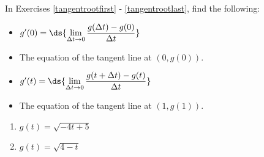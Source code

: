 \documentclass{ximera}
\begin{document}
In Exercises \ref{tangentrootfirst} - \ref{tangentrootlast},  find the following:



\begin{itemize}

\item  $g'(0) = \ds{\lim_{\Delta t \rightarrow 0} \dfrac{g(\Delta t) - g(0)}{\Delta t}}$

\item  The equation of the tangent line at $(0, g(0))$.

\item  $g'(t) =  \ds{\lim_{\Delta t \rightarrow 0} \dfrac{g(t+\Delta t) - g(t)}{\Delta t}}$

\item  The equation of the tangent line at $(1, g(1))$.

\end{itemize}




\begin{multicols}{2}
\begin{enumerate}
\setcounter{enumi}{\value{HW}}

\item\label{tangentrootfirst}  $g(t) = \sqrt{-4t+5}$
\item  \label{tangentrootlast} $g(t) = \sqrt{4-t}$


\setcounter{HW}{\value{enumi}}
\end{enumerate}
\end{multicols}
\end{document}
